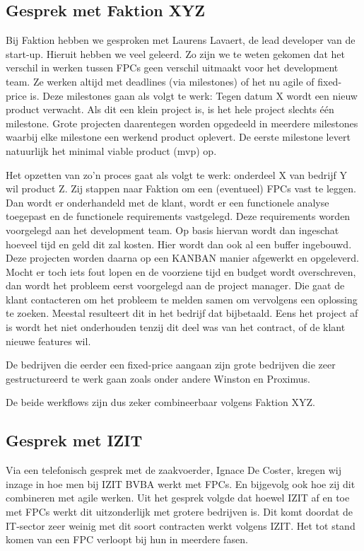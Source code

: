 \documentclass{hogent-article}
\begin{document}
    \subsection{Gesprek met Faktion XYZ}
    Bij Faktion hebben we gesproken met Laurens Lavaert, de lead developer van de start-up. Hieruit hebben we veel geleerd. Zo zijn we te weten gekomen dat het verschil in werken tussen FPCs geen verschil uitmaakt voor het development team. Ze werken altijd met deadlines (via milestones) of het nu agile of fixed-price is. Deze milestones gaan als volgt te werk: Tegen datum X wordt een nieuw product verwacht. Als dit een klein project is, is het hele project slechts één milestone. Grote projecten daarentegen worden opgedeeld in meerdere milestones waarbij elke milestone een werkend product oplevert. De eerste milestone levert natuurlijk het minimal viable product (mvp) op.
    
    Het opzetten van zo'n proces gaat als volgt te werk: onderdeel X van bedrijf Y wil product Z. Zij stappen naar Faktion om een (eventueel) FPCs vast te leggen. Dan wordt er onderhandeld met de klant, wordt er een functionele analyse toegepast en de functionele requirements vastgelegd. Deze requirements worden voorgelegd aan het development team. Op basis hiervan wordt dan ingeschat hoeveel tijd en geld dit zal kosten. Hier wordt dan ook al een buffer ingebouwd. Deze projecten worden daarna op een KANBAN manier afgewerkt en opgeleverd. Mocht er toch iets fout lopen en de voorziene tijd en budget wordt overschreven, dan wordt het probleem eerst voorgelegd aan de project manager. Die gaat de klant contacteren om het probleem te melden samen om vervolgens een oplossing te zoeken. Meestal resulteert dit in het bedrijf dat bijbetaald. Eens het project af is wordt het niet onderhouden tenzij dit deel was van het contract, of de klant nieuwe features wil.
    
    De bedrijven die eerder een fixed-price aangaan zijn grote bedrijven die zeer gestructureerd te werk gaan zoals onder andere Winston en Proximus.
    
    De beide werkflows zijn dus zeker combineerbaar volgens Faktion XYZ.
    
    \subsection{Gesprek met IZIT}
    Via een telefonisch gesprek met de zaakvoerder, Ignace De Coster, kregen wij inzage in hoe men bij IZIT BVBA werkt met FPCs. En bijgevolg ook hoe zij dit combineren met agile werken. Uit het gesprek volgde dat hoewel IZIT af en toe met FPCs werkt dit uitzonderlijk met grotere bedrijven is. Dit komt doordat de IT-sector zeer weinig met dit soort contracten werkt volgens IZIT. Het tot stand komen van een FPC verloopt bij hun in meerdere fasen.
    
\end{document}
